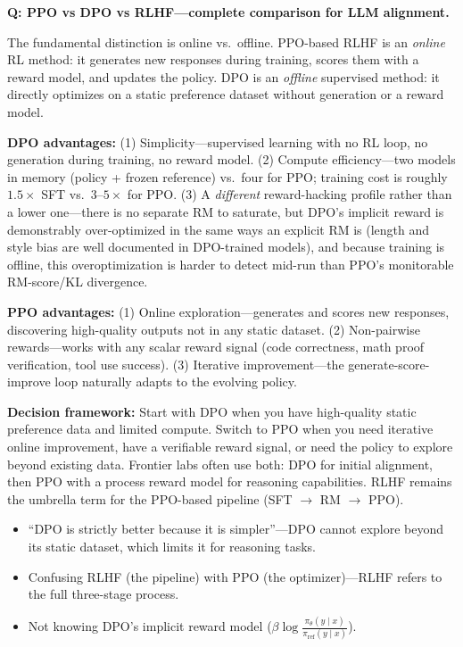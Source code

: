 \begin{interviewq}
\textbf{Q: PPO vs DPO vs RLHF---complete comparison for LLM alignment.}

 \quad {} \quad \badgefreq{\freqhigh}

\stronganswer

The fundamental distinction is online vs.\ offline. PPO-based RLHF is an \textit{online} RL method: it generates new responses during training, scores them with a reward model, and updates the policy. DPO is an \textit{offline} supervised method: it directly optimizes on a static preference dataset without generation or a reward model.

\textbf{DPO advantages:} (1) Simplicity---supervised learning with no RL loop, no generation during training, no reward model. (2) Compute efficiency---two models in memory (policy + frozen reference) vs.\ four for PPO; training cost is roughly $1.5\times$ SFT vs.\ $3$--$5\times$ for PPO. (3) A \textit{different} reward-hacking profile rather than a lower one---there is no separate RM to saturate, but DPO's implicit reward is demonstrably over-optimized in the same ways an explicit RM is (length and style bias are well documented in DPO-trained models), and because training is offline, this overoptimization is harder to detect mid-run than PPO's monitorable RM-score/KL divergence.

\textbf{PPO advantages:} (1) Online exploration---generates and scores new responses, discovering high-quality outputs not in any static dataset. (2) Non-pairwise rewards---works with any scalar reward signal (code correctness, math proof verification, tool use success). (3) Iterative improvement---the generate-score-improve loop naturally adapts to the evolving policy.

\textbf{Decision framework:} Start with DPO when you have high-quality static preference data and limited compute. Switch to PPO when you need iterative online improvement, have a verifiable reward signal, or need the policy to explore beyond existing data. Frontier labs often use both: DPO for initial alignment, then PPO with a process reward model for reasoning capabilities. RLHF remains the umbrella term for the PPO-based pipeline (SFT $\rightarrow$ RM $\rightarrow$ PPO).

\redflags
\begin{itemize}
    \item ``DPO is strictly better because it is simpler''---DPO cannot explore beyond its static dataset, which limits it for reasoning tasks.
    \item Confusing RLHF (the pipeline) with PPO (the optimizer)---RLHF refers to the full three-stage process.
    \item Not knowing DPO's implicit reward model ($\beta \log \frac{\pi_\theta(y \mid x)}{\pi_{\text{ref}}(y \mid x)}$).
\end{itemize}


\end{interviewq}

